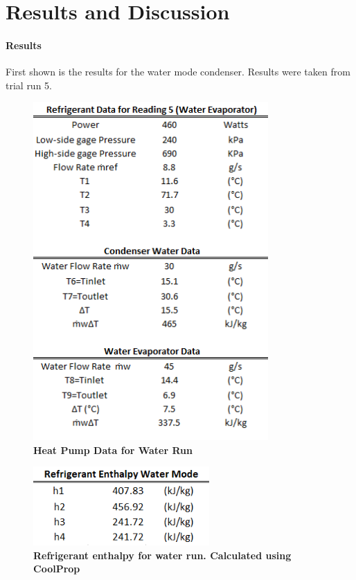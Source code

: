 \documentclass{article}
\begin{document}
\newpage
\section{Results and Discussion}\label{conclusions}
\paragraph {Results}
First shown is the results for the water mode condenser. Results were taken from trial run 5.  

\begin{figure} [H]
	\centering
	\includegraphics[width=0.8\textwidth]{W_run}
	\caption{\textbf{Heat Pump Data for Water Run}}
\end{figure}

\begin{figure} [H]
	\centering
	\includegraphics[width=0.6\textwidth]{W_enthalpy}
	\caption{\textbf{Refrigerant enthalpy for water run. Calculated using CoolProp}}
\end{figure}
\end{document}
